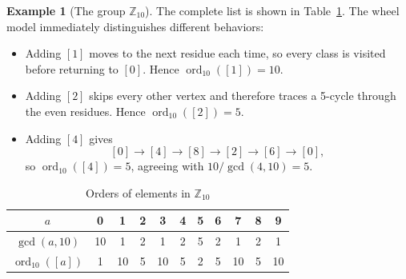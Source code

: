\documentclass[11pt,a4paper]{article}
\theoremstyle{definition}
\newtheorem{example}[theorem]{Example}
\theoremstyle{remark}
\DeclareMathOperator{\ord}{ord}
\begin{document}
\begin{example}[The group $\mathbb Z_{10}$]\label{ex:10}
The complete list is shown in Table~\ref{tab:z10}. The wheel model immediately distinguishes different behaviors:
\begin{itemize}
  \item Adding $[1]$ moves to the next residue each time, so every class is visited before returning to $[0]$. Hence $\ord_{10}([1])=10$.
  \item Adding $[2]$ skips every other vertex and therefore traces a 5-cycle through the even residues. Hence $\ord_{10}([2])=5$.
  \item Adding $[4]$ gives
  \[
  [0]\longrightarrow[4]\longrightarrow[8]\longrightarrow[2]\longrightarrow[6]\longrightarrow[0],
  \]
  so $\ord_{10}([4])=5$, agreeing with $10/\gcd(4,10)=5$.
\end{itemize}
\end{example}
\begin{table}[ht]
\centering
\caption{Orders of elements in $\mathbb Z_{10}$}\label{tab:z10}
\begin{tabular}{@{}c*{10}{c}@{}}\toprule
$a$ & 0&1&2&3&4&5&6&7&8&9\\\midrule
$\gcd(a,10)$ &10&1&2&1&2&5&2&1&2&1\\
$\ord_{10}([a])$ &1&10&5&10&5&2&5&10&5&10\\\bottomrule
\end{tabular}
\end{table}
\end{document}
